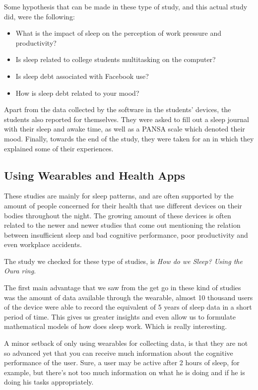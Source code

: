 \documentclass[]{IEEEtran}
\begin{document}
Some hypothesis that can be made in these type of study, and this actual study did, were the following:

\begin{itemize}
    \item What is the impact of sleep on the perception of work pressure and productivity?
    \item Is sleep related to college students multitasking on the computer?
    \item Is sleep debt associated with Facebook use?
    \item How is sleep debt related to your mood?
\end{itemize}

Apart from the data collected by the software in the students' devices, the students also reported for themselves. They were asked to fill out a sleep journal with their sleep and awake time, as well as a PANSA scale which denoted their mood. Finally, towards the end of the study, they were taken for an  in which they explained some of their experiences. 

\subsection{Using Wearables and Health Apps}

These studies are mainly for sleep patterns, and are often supported by the amount of people concerned for their health that use different devices on their bodies throughout the night. The growing amount of these devices is often related to the newer and newer studies that come out mentioning the relation between insufficient sleep and bad cognitive performance, poor productivity and even workplace accidents.  \par 

The study we checked for these type of studies, is \textit{How do we Sleep? Using the Oura ring}. \par 

The first main advantage that we saw from the get go in these kind of studies was the amount of data available through the wearable, almost 10 thousand users of the device were able to record the equivalent of 5 years of sleep data in a short period of time. This gives us greater insights and even allow us to formulate mathematical models of how does sleep work. Which is really interesting. \par 

A minor setback of only using wearables for collecting data, is that they are not so advanced yet that you can receive much information about the cognitive performance of the user. Sure, a user may be active after 2 hours of sleep, for example, but there's not too much information on what he is doing and if he is doing his tasks appropriately.
\end{document}
